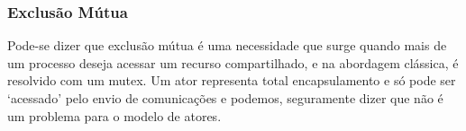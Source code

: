\documentclass[]{article}
\begin{document}
		\subsubsection{Exclusão Mútua}
		\par Pode-se dizer que exclusão mútua é uma necessidade que surge quando mais de um processo deseja
		acessar um recurso compartilhado, e na abordagem clássica, é resolvido com um mutex. Um ator representa
		total encapsulamento e só pode ser `acessado' pelo envio de comunicações e podemos, seguramente dizer que
		não é um problema para o modelo de atores.
		

		
		
		
\newpage


\end{document}
